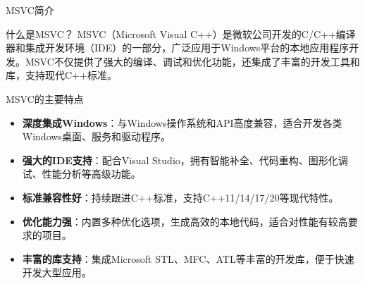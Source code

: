 \documentclass[UTF8,aspectratio=169]{beamer}
\begin{document}
\begin{frame}{MSVC简介}
    \begin{ytublock}{什么是MSVC？}
        MSVC（Microsoft Visual C++）是微软公司开发的C/C++编译器和集成开发环境（IDE）的一部分，广泛应用于Windows平台的本地应用程序开发。MSVC不仅提供了强大的编译、调试和优化功能，还集成了丰富的开发工具和库，支持现代C++标准。
    \end{ytublock}
    \begin{ytublock}{MSVC的主要特点}
        \begin{itemize}
            \item \textbf{深度集成Windows}：与Windows操作系统和API高度兼容，适合开发各类Windows桌面、服务和驱动程序。
            \item \textbf{强大的IDE支持}：配合Visual Studio，拥有智能补全、代码重构、图形化调试、性能分析等高级功能。
            \item \textbf{标准兼容性好}：持续跟进C++标准，支持C++11/14/17/20等现代特性。
            \item \textbf{优化能力强}：内置多种优化选项，生成高效的本地代码，适合对性能有较高要求的项目。
            \item \textbf{丰富的库支持}：集成Microsoft STL、MFC、ATL等丰富的开发库，便于快速开发大型应用。
        \end{itemize}
    \end{ytublock}
\end{frame}
\end{document}
